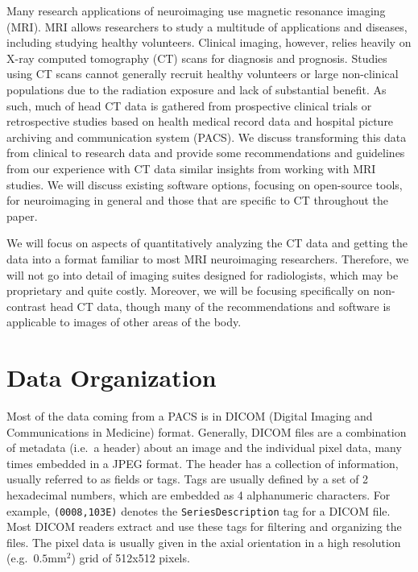 \documentclass[utf8]{frontiersSCNS}
\begin{document}
Many research applications of neuroimaging use magnetic resonance imaging (MRI). MRI allows researchers to study a multitude of applications and diseases, including studying healthy volunteers. Clinical imaging, however, relies heavily on X-ray computed tomography (CT) scans for diagnosis and prognosis. Studies using CT scans cannot generally recruit healthy volunteers or large non-clinical populations due to the radiation exposure and lack of substantial benefit. As such, much of head CT data is gathered from prospective clinical trials or retrospective studies based on health medical record data and hospital picture archiving and communication system (PACS). We discuss transforming this data from clinical to research data and provide some recommendations and guidelines from our experience with CT data similar insights from working with MRI studies. We will discuss existing software options, focusing on open-source tools, for neuroimaging in general and those that are specific to CT throughout the paper.

We will focus on aspects of quantitatively analyzing the CT data and getting the data into a format familiar to most MRI neuroimaging researchers. Therefore, we will not go into detail of imaging suites designed for radiologists, which may be proprietary and quite costly. Moreover, we will be focusing specifically on non-contrast head CT data, though many of the recommendations and software is applicable to images of other areas of the body.

\hypertarget{data-organization}{%
\section{Data Organization}\label{data-organization}}

Most of the data coming from a PACS is in DICOM (Digital Imaging and Communications in Medicine) format. Generally, DICOM files are a combination of metadata (i.e.~a header) about an image and the individual pixel data, many times embedded in a JPEG format. The header has a collection of information, usually referred to as fields or tags. Tags are usually defined by a set of 2 hexadecimal numbers, which are embedded as 4 alphanumeric characters. For example, \texttt{(0008,103E)} denotes the \texttt{SeriesDescription} tag for a DICOM file. Most DICOM readers extract and use these tags for filtering and organizing the files. The pixel data is usually given in the axial orientation in a high resolution (e.g.~\(0.5\)mm\(^2\)) grid of 512x512 pixels.
\end{document}
